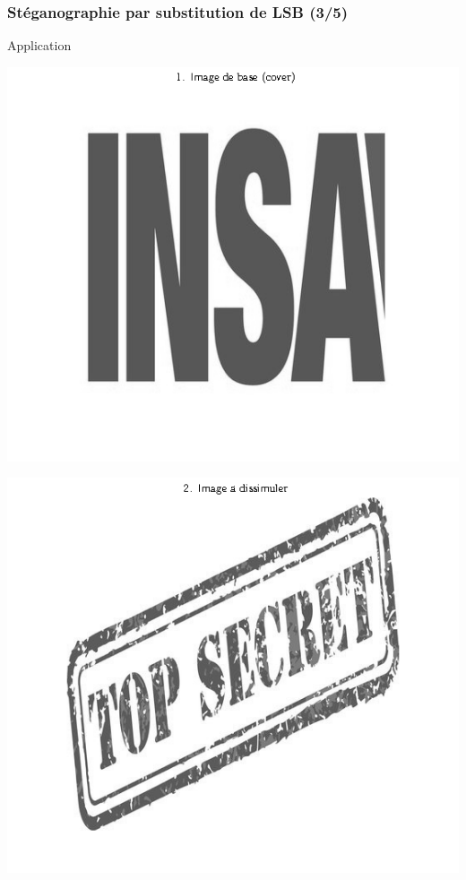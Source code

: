 \documentclass{beamer}
\begin{document}
	\begin{frame}
	\frametitle{Stéganographie par substitution de LSB (3/5)}
	\begin{exampleblock}{Application}
   	\rightskip=0pt\leftskip=0pt
	\begin{minipage}{.33\textwidth}\centering
		\includegraphics[scale=0.18]{images/fig1.png}
		{\centering{}}
		\label{fig1}
	\end{minipage}
	\begin{minipage}{.32\textwidth}\centering
		\includegraphics[scale=0.18]{images/fig2.png}

\end{minipage}
\end{exampleblock}
\end{frame}
\end{document}
